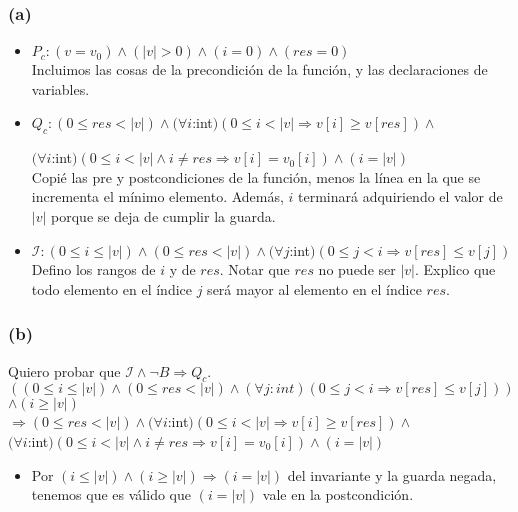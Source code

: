 \documentclass[12 pt]{article}
\begin{document}
     \subsubsection*{(a)}
        \begin{itemize}
            \item $P_{c}: (v = v_{0}) \wedge (|v| > 0) \wedge (i = 0) \wedge (res = 0)$
            \\
                Incluimos las cosas de la precondición de la función, y las declaraciones de variables.
            \item $Q_{c}: (0 \leq res < |v|) \wedge (\forall i$:int$)(0 \leq i < |v| \Rightarrow v[i] \geq v[res]) \wedge $
            
            $(\forall i$:int$)(0 \leq i < |v| \wedge i \neq res \Rightarrow v[i] = v_{0}[i]) \wedge (i = |v|)$
            \\
                Copié las pre y postcondiciones de la función, menos la línea en la que se incrementa el mínimo elemento. Además, $i$ terminará adquiriendo el valor de $|v|$ porque se deja de cumplir la guarda.
            \item $\mathcal{I}: (0 \leq i \leq |v|) \wedge (0 \leq res < |v|) \wedge (\forall j$:int$)(0 \leq j < i \Rightarrow v[res] \leq v[j])$
            \\
                Defino los rangos de $i$ y de $res$. Notar que $res$ no puede ser $|v|$. Explico que todo elemento en el índice $j$ será mayor al elemento en el índice $res$. 
        \end{itemize}
    \subsubsection*{(b)}
        Quiero probar que $\mathcal{I} \wedge \neg B \Rightarrow Q_{c}$.
        \\
        $\left((0 \leq i \leq |v|) \wedge (0 \leq res < |v|) \wedge (\forall j:int)(0 \leq j < i \Rightarrow v[res] \leq v[j])\right)$
        \\
        $\wedge \left(i \geq |v|\right)$
        \\
        $\Rightarrow (0 \leq res < |v|) \wedge (\forall i$:int$)(0 \leq i < |v| \Rightarrow v[i] \geq v[res]) \wedge $
        \\
        $(\forall i$:int$)(0 \leq i < |v| \wedge i \neq res \Rightarrow v[i] = v_{0}[i]) \wedge (i = |v|)$
        \begin{itemize}
            \item Por $(i \leq |v|) \wedge (i \geq |v|) \Rightarrow (i = |v|)$ del invariante y la guarda negada, tenemos que es válido que $(i = |v|)$ vale en la postcondición.
        \end{itemize}
\end{document}

